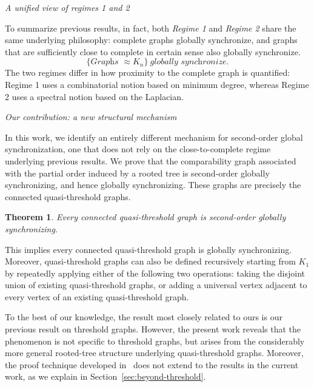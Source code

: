 \documentclass[11pt,reqno]{amsart}
\newtheorem{theorem}{Theorem}[section]
\theoremstyle{definition}
\begin{document}
\noindent
\textit{A unified view of regimes 1 and 2}
\newline

\noindent
To summarize previous results, in fact, both \textit{Regime 1} and \textit{Regime 2} share the same underlying philosophy: complete graphs globally synchronize, and graphs that are sufficiently close to complete in certain sense also globally synchronize.
\[
\{\textit{Graphs } \approx K_n\}\ \textit{globally synchronize.}
\]
The two regimes differ in how proximity to the complete graph is quantified: Regime 1 uses a combinatorial notion based on minimum degree, whereas Regime 2 uses a spectral notion based on the Laplacian.
\newline

\noindent
\textit{Our contribution: a new structural mechanism}
\newline

\noindent
In this work, we identify an entirely different mechanism for second-order global synchronization, one that does not rely on the close-to-complete regime underlying previous results.
We prove that the comparability graph associated with the partial order induced by a rooted tree is second-order globally synchronizing, and hence globally synchronizing. These graphs are precisely the connected quasi-threshold graphs.

\begin{theorem}\label{main1}
Every connected quasi-threshold graph is second-order globally synchronizing.
\end{theorem}
This implies every connected quasi-threshold graph is globally synchronizing.
Moreover, quasi-threshold graphs can also be defined recursively starting from $K_1$ by repeatedly applying either of the following two operations: taking the disjoint union of existing quasi-threshold graphs, or adding a universal vertex adjacent to every vertex of an existing quasi-threshold graph.

To the best of our knowledge, the result most closely related to ours is our previous result on threshold graphs.
However, the present work reveals that the phenomenon is not specific to threshold graphs, but arises from the considerably more general rooted-tree structure underlying quasi-threshold graphs.
Moreover, the proof technique developed in~\cite{wu2025threshold} does not extend to the results in the current work, as we explain in Section~\ref{sec:beyond-threshold}.

\end{document}
